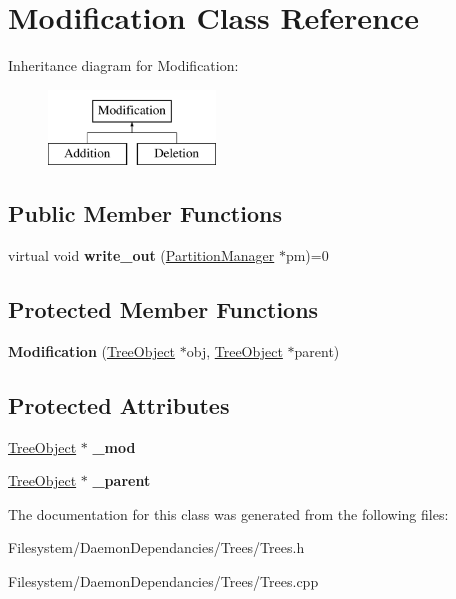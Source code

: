 \hypertarget{classModification}{}\section{Modification Class Reference}
\label{classModification}
Inheritance diagram for Modification\+:\begin{figure}[H]
\begin{center}
\leavevmode
\includegraphics[height=2.000000cm]{classModification}
\end{center}
\end{figure}
\subsection*{Public Member Functions}
\begin{DoxyCompactItemize}
\item 
virtual void {\bfseries write\+\_\+out} (\hyperlink{classPartitionManager}{Partition\+Manager} $\ast$pm)=0\hypertarget{classModification_a50d1fd809524902d2a1e78d02f4be1dc}{}\label{classModification_a50d1fd809524902d2a1e78d02f4be1dc}

\end{DoxyCompactItemize}
\subsection*{Protected Member Functions}
\begin{DoxyCompactItemize}
\item 
{\bfseries Modification} (\hyperlink{classTreeObject}{Tree\+Object} $\ast$obj, \hyperlink{classTreeObject}{Tree\+Object} $\ast$parent)\hypertarget{classModification_a76407b8c6d2adb840dceea708355aba8}{}\label{classModification_a76407b8c6d2adb840dceea708355aba8}

\end{DoxyCompactItemize}
\subsection*{Protected Attributes}
\begin{DoxyCompactItemize}
\item 
\hyperlink{classTreeObject}{Tree\+Object} $\ast$ {\bfseries \+\_\+mod}\hypertarget{classModification_a0aa2f9924cde904b1683f3bd80d87a02}{}\label{classModification_a0aa2f9924cde904b1683f3bd80d87a02}

\item 
\hyperlink{classTreeObject}{Tree\+Object} $\ast$ {\bfseries \+\_\+parent}\hypertarget{classModification_a529d02be9866b96746bcae63a763f868}{}\label{classModification_a529d02be9866b96746bcae63a763f868}

\end{DoxyCompactItemize}


The documentation for this class was generated from the following files\+:\begin{DoxyCompactItemize}
\item 
Filesystem/\+Daemon\+Dependancies/\+Trees/Trees.\+h\item 
Filesystem/\+Daemon\+Dependancies/\+Trees/Trees.\+cpp\end{DoxyCompactItemize}

